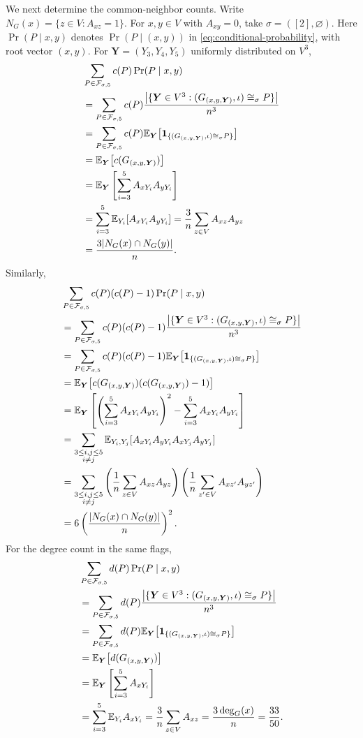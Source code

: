 We next determine the common-neighbor counts.
Write $N_G(x)=\{z\in V:A_{xz}=1\}$.
For $x,y\in V$ with $A_{xy}=0$, take
$\sigma=([2],\varnothing)$.
Here $\Pr(P\mid x,y)$ denotes $\Pr(P\mid(x,y))$ in
\eqref{eq:conditional-probability}, with root vector $(x,y)$.
For $\boldsymbol Y=(Y_3,Y_4,Y_5)$ uniformly distributed on $V^3$,
\begin{align*}
&\sum_{P\in\mathcal F_{\sigma,5}}c(P)\Pr(P\mid x,y)\\
&=\sum_{P\in\mathcal F_{\sigma,5}}c(P)
\frac{\big|\{\boldsymbol Y\in V^3:
(G_{(x,y,\boldsymbol Y)},\iota)\cong_\sigma P\}\big|}{n^3}\\
&=\sum_{P\in\mathcal F_{\sigma,5}}c(P)
\mathbb E_{\boldsymbol Y}\big[\mathbf 1_{\{(G_{(x,y,\boldsymbol Y)},\iota)\cong_\sigma P\}}\big]\\
&=\mathbb E_{\boldsymbol Y}\big[c(G_{(x,y,\boldsymbol Y)})\big]\\
&=\mathbb E_{\boldsymbol Y}\left[\sum_{i=3}^5 A_{xY_i}A_{yY_i}\right]\\
&=\sum_{i=3}^5\mathbb E_{Y_i}[A_{xY_i}A_{yY_i}]
=\frac3n\sum_{z\in V}A_{xz}A_{yz}\\
&=\frac{3|N_G(x)\cap N_G(y)|}{n}.
\end{align*}
Similarly,
\begin{align*}
&\sum_{P\in\mathcal F_{\sigma,5}}c(P)(c(P)-1)\Pr(P\mid x,y)\\
&=\sum_{P\in\mathcal F_{\sigma,5}}c(P)(c(P)-1)
\frac{\big|\{\boldsymbol Y\in V^3:
(G_{(x,y,\boldsymbol Y)},\iota)\cong_\sigma P\}\big|}{n^3}\\
&=\sum_{P\in\mathcal F_{\sigma,5}}c(P)(c(P)-1)
\mathbb E_{\boldsymbol Y}\big[\mathbf 1_{\{(G_{(x,y,\boldsymbol Y)},\iota)\cong_\sigma P\}}\big]\\
&=\mathbb E_{\boldsymbol Y}\big[
 c(G_{(x,y,\boldsymbol Y)})(c(G_{(x,y,\boldsymbol Y)})-1)\big]\\
&=\mathbb E_{\boldsymbol Y}\left[
\left(\sum_{i=3}^5 A_{xY_i}A_{yY_i}\right)^2
-\sum_{i=3}^5 A_{xY_i}A_{yY_i}\right]\\
&=\sum_{\substack{3\leq i,j\leq5\\i\ne j}}
\mathbb E_{Y_i,Y_j}[A_{xY_i}A_{yY_i}A_{xY_j}A_{yY_j}]\\
&=\sum_{\substack{3\leq i,j\leq5\\i\ne j}}
\left(\frac1n\sum_{z\in V}A_{xz}A_{yz}\right)
\left(\frac1n\sum_{z'\in V}A_{xz'}A_{yz'}\right)
\\
&=6\left(\frac{|N_G(x)\cap N_G(y)|}{n}\right)^2.
\end{align*}
For the degree count in the same flags,
\begin{align*}
&\sum_{P\in\mathcal F_{\sigma,5}}d(P)\Pr(P\mid x,y)\\
&=\sum_{P\in\mathcal F_{\sigma,5}}d(P)
\frac{\big|\{\boldsymbol Y\in V^3:
(G_{(x,y,\boldsymbol Y)},\iota)\cong_\sigma P\}\big|}{n^3}\\
&=\sum_{P\in\mathcal F_{\sigma,5}}d(P)
\mathbb E_{\boldsymbol Y}\big[\mathbf 1_{\{(G_{(x,y,\boldsymbol Y)},\iota)\cong_\sigma P\}}\big]\\
&=\mathbb E_{\boldsymbol Y}\big[d(G_{(x,y,\boldsymbol Y)})\big]\\
&=\mathbb E_{\boldsymbol Y}\left[\sum_{i=3}^5 A_{xY_i}\right]\\
&=\sum_{i=3}^5\mathbb E_{Y_i}A_{xY_i}
=\frac3n\sum_{z\in V}A_{xz}
=\frac{3\deg_G(x)}n=\frac{33}{50}.
\end{align*}
